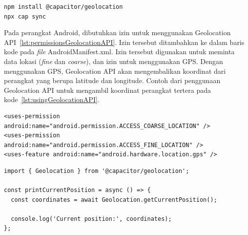 \begin{enumerate}
\begin{enumerate}
\begin{lstlisting}[label={lst:installGeolocationAPI}, caption=Kode untuk Menginstal Geolocation API]
npm install @capacitor/geolocation
npx cap sync
\end{lstlisting}

		Pada perangkat Android, dibutuhkan izin untuk menggunakan Geolocation API~\ref{lst:permissionsGeolocationAPI}. Izin tersebut ditambahkan ke dalam baris kode pada \textit{file} AndroidManifest.xml. Izin tersebut digunakan untuk meminta data lokasi (\textit{fine} dan \textit{coarse}), dan izin untuk menggunakan GPS. Dengan menggunakan GPS, Geolocation API akan mengembalikan koordinat dari perangkat yang berupa latitude dan longitude. Contoh dari penggunaan Geolocation API untuk mengambil koordinat perangkat tertera pada kode~\ref{lst:usingGeolocationAPI}.
		
\begin{lstlisting}[label={lst:permissionsGeolocationAPI}, caption=\textit{Permissions} Geolocation API pada Android]
<uses-permission android:name="android.permission.ACCESS_COARSE_LOCATION" />
<uses-permission android:name="android.permission.ACCESS_FINE_LOCATION" />
<uses-feature android:name="android.hardware.location.gps" />
\end{lstlisting}

\begin{lstlisting}[label={lst:usingGeolocationAPI}, caption=\textit{Permissions} Geolocation API pada Android]
import { Geolocation } from '@capacitor/geolocation';

const printCurrentPosition = async () => {
  const coordinates = await Geolocation.getCurrentPosition();

  console.log('Current position:', coordinates);
};
\end{lstlisting}


\end{enumerate}
\end{enumerate}
